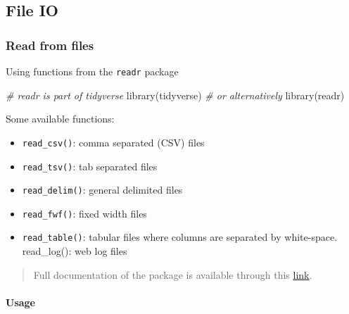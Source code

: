 \documentclass[
]{article}
\newenvironment{Shaded}{}{}
\newcommand{\CommentTok}[1]{\textcolor[rgb]{0.38,0.63,0.69}{\textit{#1}}}
\newcommand{\FunctionTok}[1]{\textcolor[rgb]{0.02,0.16,0.49}{#1}}
\newcommand{\NormalTok}[1]{#1}
\begin{document}
\hypertarget{file-io}{%
\subsection{File IO}\label{file-io}}

\hypertarget{read-from-files}{%
\subsubsection{Read from files}\label{read-from-files}}

Using functions from the \texttt{readr} package

\begin{Shaded}
\begin{Highlighting}[]
\CommentTok{\# readr is part of tidyverse }
\FunctionTok{library}\NormalTok{(tidyverse) }\CommentTok{\# or alternatively }
\FunctionTok{library}\NormalTok{(readr)}
\end{Highlighting}
\end{Shaded}

Some available functions:

\begin{itemize}
\item
  \texttt{read\_csv()}: comma separated (CSV) files
\item
  \texttt{read\_tsv()}: tab separated files
\item
  \texttt{read\_delim()}: general delimited files
\item
  \texttt{read\_fwf()}: fixed width files
\item
  \texttt{read\_table()}: tabular files where columns are separated by
  white-space. read\_log(): web log files
\end{itemize}

\begin{quote}
Full documentation of the package is available through this
\href{https://www.rdocumentation.org/packages/readr/versions/1.3.1}{link}.
\end{quote}

\hypertarget{usage}{%
\paragraph{Usage}\label{usage}}
\end{document}
